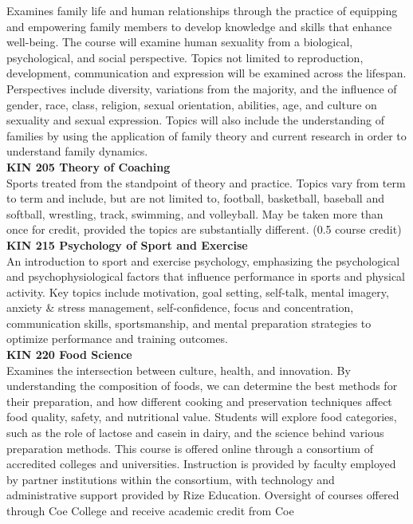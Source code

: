 \documentclass[
  letterpaper,
]{scrbook}
\begin{document}
Examines family life and human relationships through the practice of
equipping and empowering family members to develop knowledge and skills
that enhance well-being. The course will examine human sexuality from a
biological, psychological, and social perspective. Topics not limited to
reproduction, development, communication and expression will be examined
across the lifespan. Perspectives include diversity, variations from the
majority, and the influence of gender, race, class, religion, sexual
orientation, abilities, age, and culture on sexuality and sexual
expression. Topics will also include the understanding of families by
using the application of family theory and current research in order to
understand family dynamics.\\
\textbf{KIN 205 Theory of Coaching}\\
Sports treated from the standpoint of theory and practice. Topics vary
from term to term and include, but are not limited to, football,
basketball, baseball and softball, wrestling, track, swimming, and
volleyball. May be taken more than once for credit, provided the topics
are substantially different. (0.5 course credit)\\
\textbf{KIN 215 Psychology of Sport and Exercise}\\
An introduction to sport and exercise psychology, emphasizing the
psychological and psychophysiological factors that influence performance
in sports and physical activity. Key topics include motivation, goal
setting, self-talk, mental imagery, anxiety \& stress management,
self-confidence, focus and concentration, communication skills,
sportsmanship, and mental preparation strategies to optimize performance
and training outcomes.\\
\textbf{KIN 220 Food Science}\\
Examines the intersection between culture, health, and innovation. By
understanding the composition of foods, we can determine the best
methods for their preparation, and how different cooking and
preservation techniques affect food quality, safety, and nutritional
value. Students will explore food categories, such as the role of
lactose and casein in dairy, and the science behind various preparation
methods. This course is offered online through a consortium of
accredited colleges and universities. Instruction is provided by faculty
employed by partner institutions within the consortium, with technology
and administrative support provided by Rize Education. Oversight of
courses offered through Coe College and receive academic credit from Coe
\end{document}
